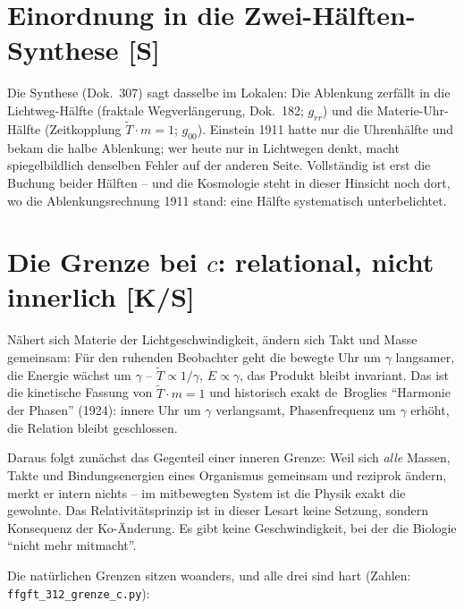 \documentclass[11pt]{report}
\begin{document}
\section{Einordnung in die Zwei-Hälften-Synthese [S]}

Die Synthese (Dok.~307) sagt dasselbe im Lokalen: Die Ablenkung
zerfällt in die Lichtweg-Hälfte (fraktale Wegverlängerung,
Dok.~182; $g_{rr}$) und die Materie-Uhr-Hälfte (Zeitkopplung
$\tilde T \cdot m = 1$; $g_{00}$). Einstein 1911 hatte nur die
Uhrenhälfte und bekam die halbe Ablenkung; wer heute nur in
Lichtwegen denkt, macht spiegelbildlich denselben Fehler auf der
anderen Seite. Vollständig ist erst die Buchung beider Hälften --
und die Kosmologie steht in dieser Hinsicht noch dort, wo die
Ablenkungsrechnung 1911 stand: eine Hälfte systematisch
unterbelichtet.

\section{Die Grenze bei $c$: relational, nicht innerlich [K/S]}

Nähert sich Materie der Lichtgeschwindigkeit, ändern sich Takt und
Masse gemeinsam: Für den ruhenden Beobachter geht die bewegte Uhr
um $\gamma$ langsamer, die Energie wächst um $\gamma$ --
$\tilde T \propto 1/\gamma$, $E \propto \gamma$, das Produkt bleibt
invariant. Das ist die kinetische Fassung von
$\tilde T \cdot m = 1$ und historisch exakt de~Broglies
\enquote{Harmonie der Phasen} (1924): innere Uhr um $\gamma$
verlangsamt, Phasenfrequenz um $\gamma$ erhöht, die Relation bleibt
geschlossen.

Daraus folgt zunächst das Gegenteil einer inneren Grenze: Weil sich
\emph{alle} Massen, Takte und Bindungsenergien eines Organismus
gemeinsam und reziprok ändern, merkt er intern nichts -- im
mitbewegten System ist die Physik exakt die gewohnte. Das
Relativitätsprinzip ist in dieser Lesart keine Setzung, sondern
Konsequenz der Ko-Änderung. Es gibt keine Geschwindigkeit, bei der
die Biologie \enquote{nicht mehr mitmacht}.

Die natürlichen Grenzen sitzen woanders, und alle drei sind hart
(Zahlen: \texttt{ffgft\_312\_grenze\_c.py}):
\end{document}
